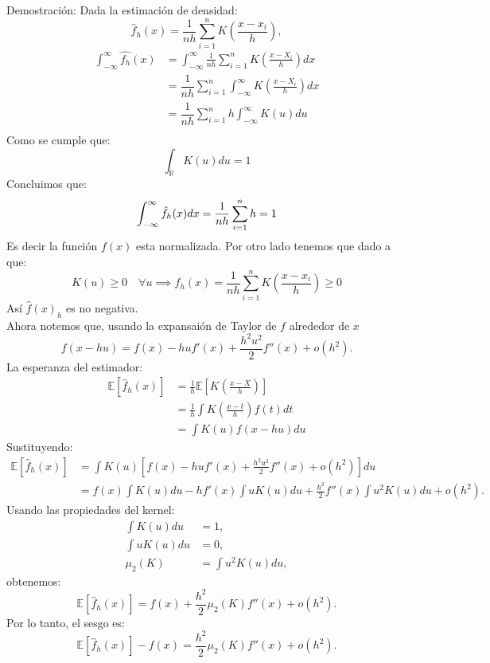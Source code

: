 \documentclass[a4paper,11pt]{article}
\begin{document}
\begin{demostracion}{Demostración:}
    Dada la estimación de densidad:
    \[
        \hat{f}_{h}(x) = \frac{1}{nh} \sum_{i=1}^{n} K\left(\frac{x-x_i}{h}\right),
    \]
    \begin{align*}
        \int_{-\infty}^{\infty}\hat{f_h} (x) & =
        \int_{-\infty}^{\infty} \frac{1}{nh} \sum_{i=1}^n K\left( \frac{x - X_i}{h} \right)dx                                       \\
                                             & =\dfrac{1}{nh}\sum_{i=1}^n\int_{-\infty}^{\infty}K\left( \frac{x - X_i}{h} \right)dx \\
                                             & =\dfrac{1}{nh}\sum_{i=1}^n h\int_{-\infty}^{\infty}K\left(u\right)du                 \\
    \end{align*}
    Como se cumple que:
    \[
        \int_\mathbb{R}K(u)du=1
    \]
    Concluimos que:
    \[
        \int_{-\infty}^\infty \hat{f}_h(x)dx=\dfrac{1}{nh}\sum_{i=1}^n h=1 \\
    \]
    Es decir la función $f(x)$ esta normalizada.
    Por otro lado tenemos que dado a que:
    \[
        K(u)\geq0 \quad\forall u\implies  \hat{f}_{h}(x) = \frac{1}{nh} \sum_{i=1}^{n} K\left(\frac{x-x_i}{h}\right)\geq0
    \]
    Así $\hat{f}(x)_h$ es no negativa.\\
    Ahora notemos que, usando la expansaión de Taylor de $f$ alrededor de $x$
    \[
        f(x - hu) = f(x) - hu f'(x) + \frac{h^2 u^2}{2} f''(x) + o(h^2).
    \]
    La esperanza del estimador:
    \begin{align*}
        \mathbb{E}[\hat{f}_h(x)]
         & = \frac{1}{h} \mathbb{E}\left[ K\left( \frac{x - X}{h} \right) \right] \\
         & = \frac{1}{h} \int K\left( \frac{x - t}{h} \right) f(t)  dt            \\
         & = \int K(u) f(x - hu)  du
    \end{align*}
    Sustituyendo:
    \begin{align*}
        \mathbb{E}[\hat{f}_h(x)]
         & = \int K(u) \left[ f(x) - hu f'(x) + \frac{h^2 u^2}{2} f''(x) + o(h^2) \right] du                 \\
         & = f(x) \int K(u)  du - h f'(x) \int u K(u)  du + \frac{h^2}{2} f''(x) \int u^2 K(u)  du + o(h^2).
    \end{align*}
    Usando las propiedades del kernel:
    \begin{align*}
        \int K(u)  du   & = 1,                 \\
        \int u K(u)  du & = 0,                 \\
        \mu_2(K)        & = \int u^2 K(u)  du,
    \end{align*}
    obtenemos:
    \[
        \mathbb{E}[\hat{f}_h(x)] = f(x) + \frac{h^2}{2} \mu_2(K) f''(x) + o(h^2).
    \]
    Por lo tanto, el sesgo es:
    \[
        \mathbb{E}[\hat{f}_h(x)] - f(x) = \frac{h^2}{2} \mu_2(K) f''(x) + o(h^2).
    \]

\end{demostracion}
\end{document}

